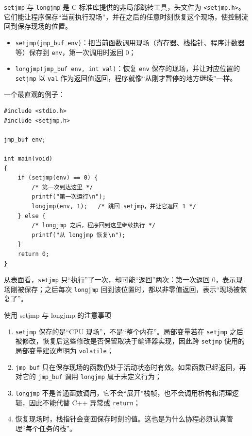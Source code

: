 \texttt{setjmp} 与 \texttt{longjmp} 是 C 标准库提供的非局部跳转工具，头文件为 \texttt{<setjmp.h>}。它们能让程序保存“当前执行现场”，并在之后的任意时刻恢复这个现场，使控制流回到保存现场的位置。

\begin{itemize}
\item \texttt{setjmp(jmp\_buf env)}：把当前函数调用现场（寄存器、栈指针、程序计数器等）保存到 \texttt{env}，第一次调用时返回 0；
\item \texttt{longjmp(jmp\_buf env, int val)}：恢复 \texttt{env} 保存的现场，并让对应位置的 \texttt{setjmp} 以 \texttt{val} 作为返回值返回，程序就像“从刚才暂停的地方继续”一样。
\end{itemize}

一个最直观的例子：

\begin{lstlisting}[style=c]
#include <stdio.h>
#include <setjmp.h>

jmp_buf env;

int main(void)
{
    if (setjmp(env) == 0) {
        /* 第一次到达这里 */
        printf("第一次运行\n");
        longjmp(env, 1);   /* 跳回 setjmp，并让它返回 1 */
    } else {
        /* longjmp 之后，程序回到这里继续执行 */
        printf("从 longjmp 恢复\n");
    }
    return 0;
}
\end{lstlisting}

从表面看，\texttt{setjmp} 只“执行”了一次，却可能“返回”两次：第一次返回 0，表示现场刚被保存；之后每次 \texttt{longjmp} 回到该位置时，都以非零值返回，表示“现场被恢复了”。

\begin{anybox}{使用 setjmp 与 longjmp 的注意事项}

\begin{enumerate}
\item \texttt{setjmp} 保存的是“CPU 现场”，不是“整个内存”。局部变量若在 \texttt{setjmp} 之后被修改，恢复后这些修改是否保留取决于编译器实现，因此跨 \texttt{setjmp} 使用的局部变量建议声明为 \texttt{volatile}；
\item \texttt{jmp\_buf} 只在保存现场的函数仍处于活动状态时有效。如果函数已经返回，再对它的 \texttt{jmp\_buf} 调用 \texttt{longjmp} 属于未定义行为；
\item \texttt{longjmp} 不是普通函数调用，它不会“展开”栈帧，也不会调用析构和清理逻辑，因此不能代替 C++ 异常或 \texttt{return}；
\item 恢复现场时，栈指针会变回保存时刻的值。这也是为什么协程必须认真管理“每个任务的栈”。
\end{enumerate}

\end{anybox}
